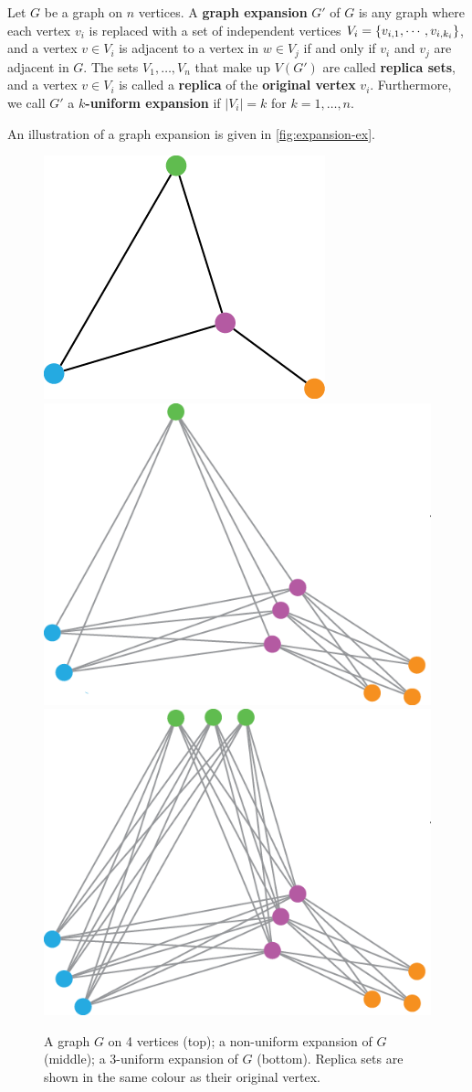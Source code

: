 \begin{definition} \label{def:graph-expansion}
Let $G$ be a graph on $n$ vertices. A \textbf{graph expansion} $G'$ of $G$ is any graph where each vertex $v_i$ is replaced with a set of independent vertices $V_i = \{ v_{i, 1}, \cdots, v_{i, k_i} \}$, and a vertex $v \in V_i$ is adjacent to a vertex in $w \in V_j$ if and only if $v_i$ and $v_j$ are adjacent in $G$. The sets $V_1, \dots, V_n$ that make up $V(G')$ are called \textbf{replica sets}, and a vertex $v \in V_i$ is called a \textbf{replica} of the \textbf{original vertex} $v_i$. Furthermore, we call $G'$ a \textbf{$k$-uniform expansion} if $|V_i| = k$ for $k = 1, \dots, n$. 
\end{definition}

An illustration of a graph expansion is given in \autoref{fig:expansion-ex}.

\begin{figure}[bth] 
    \myfloatalign
    \subfloat
    {\includegraphics[width=.25\linewidth]{figures/expansion-before.png}} \\
    \subfloat
    {\includegraphics[width=.40\linewidth]{figures/expansion-nonuniform.png}} \\
    \subfloat
    {\includegraphics[width=.47\linewidth]{figures/expansion-uniform.png}} 
    \caption{A graph $G$ on 4 vertices (top); a non-uniform expansion of $G$ (middle); a 3-uniform expansion of $G$ (bottom). Replica sets are shown in the same colour as their original vertex.}\label{fig:expansion-ex}
\end{figure}

